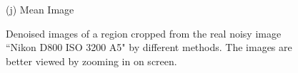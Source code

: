 \documentclass[10pt,onecolumn,letterpaper]{article}
\begin{document}
\begin{figure}[H]
{\begin{minipage}[t]{0.196\textwidth}
{\footnotesize (j) Mean Image \cite{crosschannel2016} }
\end{minipage}
}
\caption{Denoised images of a region cropped from the real noisy image ``Nikon D800 ISO 3200 A5" \cite{crosschannel2016} by different methods. The images are better viewed by zooming in on screen.} 
\label{fig20}
\end{figure}


{\small


}
\end{document}

